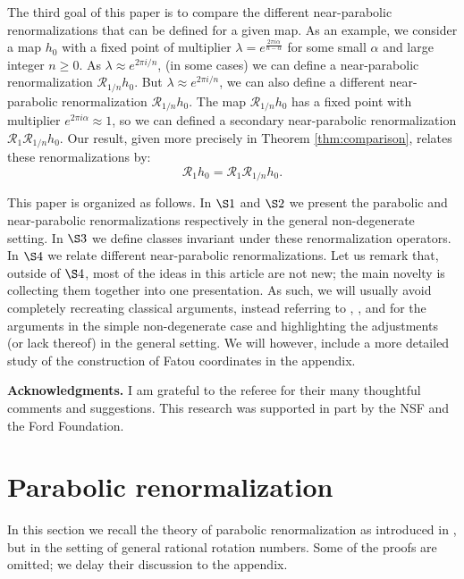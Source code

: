 \documentclass[12pt,letterpaper]{amsart}
\numberwithin{equation}{section}
\theoremstyle{remark}
\theoremstyle{definition}
\newcommand{\RR}{\mathcal R}
\begin{document}
	The third goal of this paper is to compare the different  near-parabolic renormalizations that can be defined for a given map. 
	As an example, we consider a map 
	$h_0$ with a fixed point of multiplier $\lambda = e^{\frac{2\pi i \alpha}{n-\alpha}}$ for some small $\alpha$ and large integer $n\geq 0$.
	As $\lambda\approx e^{2\pi i /n}$, (in some cases) we can define a near-parabolic renormalization $\RR_{1/n} h_0$.
	But $\lambda\approx e^{2\pi i /n}$, we can also define a different near-parabolic renormalization $\RR_{1/n}h_0$. The map $\RR_{1/n}h_0$ has a fixed point with multiplier $e^{2\pi i \alpha}\approx 1$, so we can defined a secondary near-parabolic renormalization $\RR_1\RR_{1/n}h_0$. Our result, given more precisely in Theorem \ref{thm:comparison}, relates these renormalizations by: $$\RR_1 h_0 = \RR_1\RR_{1/n}h_0.$$
	
	
	

	This paper is organized as follows.
	In  $\S1$ and $\S2$ we present the parabolic and near-parabolic renormalizations respectively in the general non-degenerate setting. In  $\S3$ we define classes invariant under these renormalization operators. 
	In $\S4$ we relate different near-parabolic renormalizations.
	Let us remark that, outside of $\S4$, most of the ideas in this article are not new; the main novelty is collecting them together into one presentation. As such, we will usually avoid completely recreating classical arguments, instead referring to \cite{shishikura_1}, \cite{shishikura}, and \cite{Cheritat22} for the arguments in the simple non-degenerate case and highlighting the adjustments (or lack thereof) in the general setting. We will however, include a more detailed study of the construction of Fatou coordinates in the appendix. 
	
	
	\noindent \textbf{Acknowledgments.} I am grateful to the referee for their many thoughtful comments and suggestions. This research was supported in part by the NSF and the Ford Foundation.
	
	
	
	
	
	
	
		
	
	\section{Parabolic  renormalization}\label{sec:parabolic}
	
	In this section we recall the theory of parabolic renormalization as introduced in \cite{shishikura_1}, but in the setting of general rational rotation numbers. 
	Some of the proofs are omitted;  we delay their discussion to the appendix.
	
\end{document}
